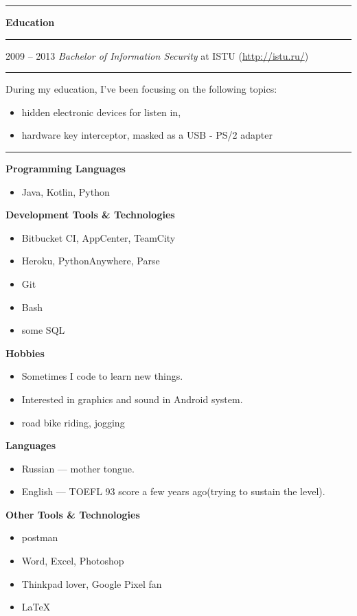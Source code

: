 \documentclass[11pt]{article}
\newcommand\CvSmallSkipLength{0.5em}
\newcommand\CvBigSkipLength{1em}
\newcommand\CvSkip[1]{\vspace{#1}}
\newcommand\CvSmallSkip{\CvSkip{\CvSmallSkipLength}}
\newcommand\CvBigSkip{\CvSkip{\CvBigSkipLength}}
\newcommand\CvSectionHeader[1]{\CvBigSkip\textbf{#1}\CvBigSkip}
\newcommand\CvRule{\begingroup\color{CvRuleColor}\hrule\endgroup}
\newcommand\CvWorkplaceHeader[5]{\begingroup%
  \CvRule%
  \fboxsep0pt%
  \colorbox{CvWorkplaceHeaderColor}{%
    \begin{minipage}{\linewidth-2\fboxsep}%
\CvSmallSkip%
#1 -- #2 \hfill \textit{#3} at #4 (\href{http://#5/}{#5})%
\CvSmallSkip%
    \end{minipage}%
  }%
  \CvRule%
\endgroup%
}
\newenvironment{CvWorkplaceDescription}{%
    \begingroup\setlength\parskip{\CvSmallSkipLength}%
  }{%
    \CvSmallSkip\endgroup%
  }
\begin{document}
\CvRule

\CvSectionHeader{Education}

\CvWorkplaceHeader{2009}{2013}{Bachelor of Information Security}{ISTU}{http://istu.ru/}

\begin{CvWorkplaceDescription}
During my education, I've been focusing on the following topics:
\begin{itemize}[noitemsep]
  \item hidden electronic devices for listen in,
  \item hardware key interceptor, masked as a USB - PS/2 adapter
\end{itemize}
\end{CvWorkplaceDescription}
\CvRule

\begin{minipage}[t]{.5\linewidth}
  \CvSectionHeader{Programming Languages}

  \begin{itemize}
    \item Java, Kotlin, Python
  \end{itemize}

  \CvSectionHeader{Development Tools \& Technologies}

  \begin{itemize}
    \item Bitbucket CI, AppCenter, TeamCity
    \item Heroku, PythonAnywhere, Parse
   \item Git
   \item Bash
   \item some SQL
  \end{itemize}

  \CvSectionHeader{Hobbies}

  \begin{itemize}
    \item Sometimes I code to learn new things. 
 \item Interested in graphics and sound in Android system.
   \item road bike riding, jogging
  \end{itemize}
\end{minipage}
\begin{minipage}[t]{.5\linewidth}
  \CvSectionHeader{Languages}

  \begin{itemize}
    \item Russian --- mother tongue.
    \item English --- TOEFL 93 score a few years ago(trying to sustain the level).
  \end{itemize}

  \CvSectionHeader{Other Tools \& Technologies}

  \begin{itemize}
    \item postman
   \item Word, Excel, Photoshop
    \item Thinkpad lover, Google Pixel fan
    \item \LaTeX
  \end{itemize}
\end{minipage}
\end{document}
